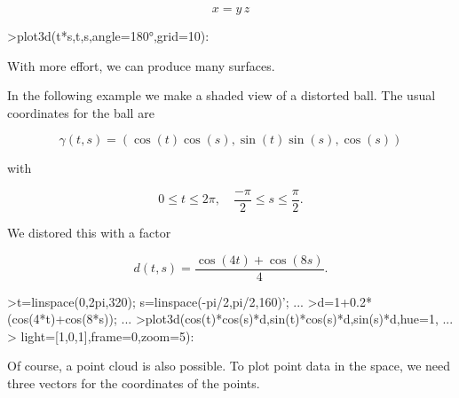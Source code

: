 \documentclass[a4paper,10pt]{article}
\begin{document}
\begin{eulernotebook}
\begin{eulercomment}
\end{eulercomment}
\begin{eulerformula}
\[
x = y \, z
\]
\end{eulerformula}
\begin{eulerprompt}
>plot3d(t*s,t,s,angle=180°,grid=10):
\end{eulerprompt}
\begin{eulercomment}
With more effort, we can produce many surfaces.

In the following example we make a shaded view of a distorted ball. The usual coordinates for the ball are

\end{eulercomment}
\begin{eulerformula}
\[
\gamma(t,s) = (\cos(t)\cos(s),\sin(t)\sin(s),\cos(s))
\]
\end{eulerformula}
\begin{eulercomment}
with

\end{eulercomment}
\begin{eulerformula}
\[
0 \le t \le 2\pi, \quad \frac{-\pi}{2} \le s \le \frac{\pi}{2}.
\]
\end{eulerformula}
\begin{eulercomment}
We distored this with a factor

\end{eulercomment}
\begin{eulerformula}
\[
d(t,s) = \frac{\cos(4t)+\cos(8s)}{4}.
\]
\end{eulerformula}
\begin{eulerprompt}
>t=linspace(0,2pi,320); s=linspace(-pi/2,pi/2,160)'; ...
>d=1+0.2*(cos(4*t)+cos(8*s)); ...
>plot3d(cos(t)*cos(s)*d,sin(t)*cos(s)*d,sin(s)*d,hue=1, ...
>  light=[1,0,1],frame=0,zoom=5):
\end{eulerprompt}
\begin{eulercomment}
Of course, a point cloud is also possible. To plot point data in the space, we need three vectors for the coordinates of
the points.


\end{eulercomment}
\end{eulernotebook}
\end{document}
